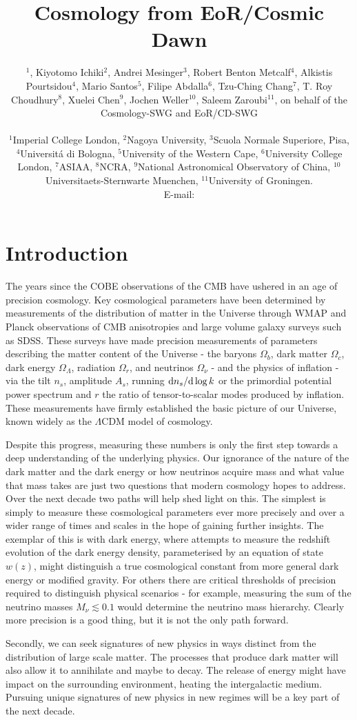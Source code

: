\documentclass{PoS}
\title{Cosmology from EoR/Cosmic Dawn}
\author{\speaker{Jonathan Pritchard}$^1$, Kiyotomo Ichiki$^2$, Andrei Mesinger$^3$, Robert Benton Metcalf$^4$, Alkistis Pourtsidou$^4$, Mario Santos$^5$, Filipe Abdalla$^6$, Tzu-Ching Chang$^7$, T. Roy Choudhury$^8$, Xuelei Chen$^9$, Jochen Weller$^{10}$, Saleem Zaroubi$^{11}$,
on behalf of the Cosmology-SWG and EoR/CD-SWG


        

\\
        $^1$Imperial College London,
        $^2$Nagoya University,
        $^3$Scuola Normale Superiore, Pisa,
        $^4$Universit\'{a} di Bologna,
        $^5$University of the Western Cape,
        $^6$University College London,
        $^7$ASIAA,
        $^8$NCRA,
        $^9$National Astronomical Observatory of China,
        $^{10}$ Universitaets-Sternwarte Muenchen,
        $^{11}$University of Groningen.
        \\
        E-mail: \email{j.pritchard@imperial.ac.uk}}
\newcommand{\ud}{{\rm d}}
\begin{document}
\section{Introduction}

The years since the COBE observations of the CMB have ushered in an age of precision cosmology. Key cosmological parameters have been determined by measurements of the distribution of matter in the Universe through WMAP and Planck observations of CMB anisotropies and large volume galaxy surveys such as SDSS. These surveys have made precision measurements of parameters describing the matter content of the Universe - the baryons $\Omega_b$, dark matter $\Omega_c$, dark energy $\Omega_\Lambda$, radiation $\Omega_r$, and neutrinos $\Omega_\nu$ - and the physics of inflation - via the tilt $n_s$, amplitude $A_s$, running $\ud n_s/\ud\log k$ or the primordial potential power spectrum and $r$ the ratio of tensor-to-scalar modes produced by inflation. These measurements have firmly established the basic picture of our Universe, known widely as the $\Lambda$CDM model of cosmology.

Despite this progress, measuring these numbers is only the first step towards a deep understanding of the underlying physics. Our ignorance of the nature of the dark matter and the dark energy or how neutrinos acquire mass and what value that mass takes are just two questions that modern cosmology hopes to address. Over the next decade two paths will help shed light on this. The simplest is simply to measure these cosmological parameters ever more precisely and over a wider range of times and scales in the hope of gaining further insights. The exemplar of this is with dark energy, where attempts to measure the redshift evolution of the dark energy density, parameterised by an equation of state $w(z)$, might distinguish a true cosmological constant from more general dark energy or modified gravity. For others there are critical thresholds of precision required to distinguish physical scenarios - for example, measuring the sum of the neutrino masses $M_\nu\lesssim0.1$ would determine the neutrino mass hierarchy. Clearly more precision is a good thing, but it is not the only path forward.

Secondly, we can seek signatures of new physics in ways distinct from the distribution of large scale matter. The processes that produce dark matter will also allow it to annihilate and maybe to decay. The release of energy might have impact on the surrounding environment, heating the intergalactic medium. Pursuing unique signatures of new physics in new regimes will be a key part of the next decade.
\end{document}
